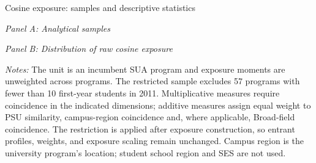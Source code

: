 \documentclass{beamer}
\begin{document}
\begin{frame}{Cosine exposure: samples and descriptive statistics}

\begin{table}
\centering
\tiny

\renewcommand{\arraystretch}{0.95}

\textit{Panel A: Analytical samples}

\vspace{0.02cm}

\resizebox{0.62\textwidth}{!}{

}

\vspace{0.08cm}

\textit{Panel B: Distribution of raw cosine exposure}

\vspace{0.02cm}

\resizebox{0.95\textwidth}{!}{

}

\vspace{0.06cm}

\parbox{0.95\textwidth}{
\tiny
\textit{Notes:}
The unit is an incumbent SUA program and exposure moments are unweighted
across programs. The restricted sample excludes 57 programs with fewer than
10 first-year students in 2011. Multiplicative measures require coincidence
in the indicated dimensions; additive measures assign equal weight to PSU
similarity, campus-region coincidence and, where applicable, Broad-field
coincidence. The restriction is applied after exposure construction, so
entrant profiles, weights, and exposure scaling remain unchanged. Campus
region is the university program's location; student school region and SES
are not used.
}

\end{table}

\end{frame}

\end{document}
